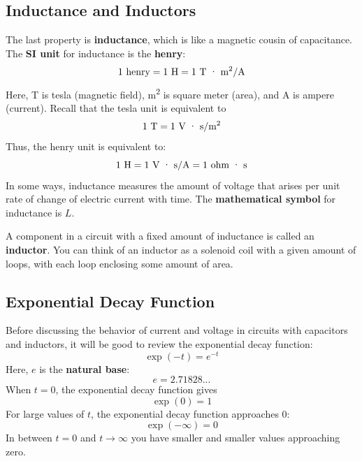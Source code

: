 \subsection{Inductance and Inductors}
%
The last property is \textbf{inductance}, which is like a magnetic cousin of capacitance. The \textbf{SI unit} for inductance is the \textbf{henry}:
\begin{equation}
	1 \ \text{henry} = 1 \ \text{H} = 1 \ \text{T {\textperiodcentered} m\textsuperscript{2}/A}
\end{equation}
Here, T is tesla (magnetic field), m\textsuperscript{2} is square meter (area), and A is ampere (current). Recall that the tesla unit is equivalent to
\begin{equation}
    1 \ \text{T} = 1 \ \text{V {\textperiodcentered} s/m\textsuperscript{2}}
\end{equation}
Thus, the henry unit is equivalent to:
\begin{equation}
    1 \ \text{H} = 1 \ \text{V {\textperiodcentered} s/A} = 1 \ \text{ohm {\textperiodcentered} s}
\end{equation}
In some ways, inductance measures the amount of voltage that arises per unit rate of change of electric current with time. The \textbf{mathematical symbol} for inductance is $L$.

A component in a circuit with a fixed amount of inductance is called an \textbf{inductor}. You can think of an inductor as a solenoid coil with a given amount of loops, with each loop enclosing some amount of area.
%
\subsection{Exponential Decay Function}
%
Before discussing the behavior of current and voltage in circuits with capacitors and inductors, it will be good to review the exponential decay function:
\begin{equation}
    \exp(-t) = e^{-t}
\end{equation}
Here, $e$ is the \textbf{natural base}:
\begin{equation}
    e = 2.71828...
\end{equation}
When $t = 0$, the exponential decay function gives
\begin{equation}
    \exp(0) = 1
\end{equation}
For large values of $t$, the exponential decay function approaches 0:
\begin{equation}
    \exp(-\infty) = 0
\end{equation}
In between $t = 0$ and $t \rightarrow \infty$ you have smaller and smaller values approaching zero.

